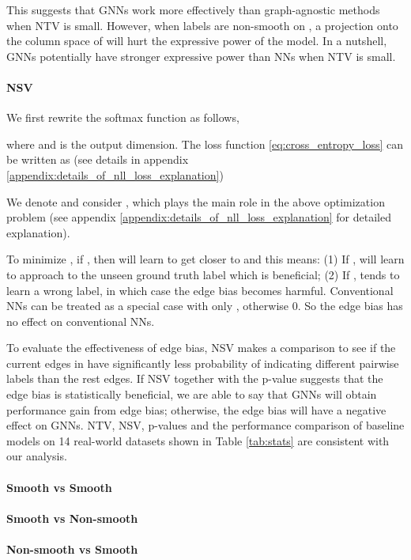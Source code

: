 \documentclass{article}
\newcommand{\0}{{\boldsymbol{0}}}
\newcommand{\6}{{\partial}}
\newcommand{\8}{{\infty}}
\newcommand{\4}{{\nabla}}
\begin{document}
This suggests that GNNs work more effectively than graph-agnostic methods when NTV is small. However, when labels are non-smooth on , a projection onto the column space of   will hurt the expressive power of the model. In a nutshell, GNNs potentially have stronger expressive power than NNs when NTV is small.


\paragraph{NSV} We first rewrite the softmax function as follows,

where  and  is the output dimension. The loss function \eqref{eq:cross_entropy_loss} can be written as (see details in appendix \ref{appendix:details_of_nll_loss_explanation})

We denote  and consider , which plays the main role in the above optimization problem (see appendix \ref{appendix:details_of_nll_loss_explanation} for detailed explanation). 

To minimize , if , then  will learn to get closer to  and this means: (1) If ,  will learn to approach to the unseen ground truth label  which is beneficial; (2) If ,  tends to learn a wrong label, in which case the edge bias becomes harmful. Conventional NNs can be treated as a special case with only , otherwise 0. So the edge bias has no effect on conventional NNs.

To evaluate the effectiveness of edge bias, NSV makes a comparison to see if the current edges in  have significantly less probability of indicating different pairwise labels than the rest edges. If NSV together with the p-value suggests that the edge bias is statistically beneficial, we are able to say that GNNs will obtain performance gain from edge bias; otherwise, the edge bias will have a negative effect on GNNs. NTV, NSV, p-values and the performance comparison of baseline models on 14 real-world datasets shown in Table \ref{tab:stats} are consistent with our analysis.


\paragraph{Smooth  vs Smooth }

\paragraph{Smooth  vs Non-smooth }

\paragraph{Non-smooth  vs Smooth }
\end{document}
